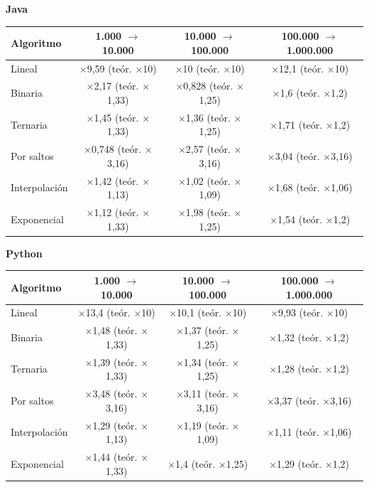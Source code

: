 \textbf{Java}\par\smallskip
{\footnotesize
\begin{tabular}{lccc}
\toprule
Algoritmo & 1.000 $\to$ 10.000 & 10.000 $\to$ 100.000 & 100.000 $\to$ 1.000.000 \\
\midrule
Lineal & $\times$9,59 (te\'or. $\times$10) & $\times$10 (te\'or. $\times$10) & $\times$12,1 (te\'or. $\times$10) \\
Binaria & $\times$2,17 (te\'or. $\times$1,33) & $\times$0,828 (te\'or. $\times$1,25) & $\times$1,6 (te\'or. $\times$1,2) \\
Ternaria & $\times$1,45 (te\'or. $\times$1,33) & $\times$1,36 (te\'or. $\times$1,25) & $\times$1,71 (te\'or. $\times$1,2) \\
Por saltos & $\times$0,748 (te\'or. $\times$3,16) & $\times$2,57 (te\'or. $\times$3,16) & $\times$3,04 (te\'or. $\times$3,16) \\
Interpolaci\'on & $\times$1,42 (te\'or. $\times$1,13) & $\times$1,02 (te\'or. $\times$1,09) & $\times$1,68 (te\'or. $\times$1,06) \\
Exponencial & $\times$1,12 (te\'or. $\times$1,33) & $\times$1,98 (te\'or. $\times$1,25) & $\times$1,54 (te\'or. $\times$1,2) \\
\bottomrule
\end{tabular}}\par
\medskip
\textbf{Python}\par\smallskip
{\footnotesize
\begin{tabular}{lccc}
\toprule
Algoritmo & 1.000 $\to$ 10.000 & 10.000 $\to$ 100.000 & 100.000 $\to$ 1.000.000 \\
\midrule
Lineal & $\times$13,4 (te\'or. $\times$10) & $\times$10,1 (te\'or. $\times$10) & $\times$9,93 (te\'or. $\times$10) \\
Binaria & $\times$1,48 (te\'or. $\times$1,33) & $\times$1,37 (te\'or. $\times$1,25) & $\times$1,32 (te\'or. $\times$1,2) \\
Ternaria & $\times$1,39 (te\'or. $\times$1,33) & $\times$1,34 (te\'or. $\times$1,25) & $\times$1,28 (te\'or. $\times$1,2) \\
Por saltos & $\times$3,48 (te\'or. $\times$3,16) & $\times$3,11 (te\'or. $\times$3,16) & $\times$3,37 (te\'or. $\times$3,16) \\
Interpolaci\'on & $\times$1,29 (te\'or. $\times$1,13) & $\times$1,19 (te\'or. $\times$1,09) & $\times$1,11 (te\'or. $\times$1,06) \\
Exponencial & $\times$1,44 (te\'or. $\times$1,33) & $\times$1,4 (te\'or. $\times$1,25) & $\times$1,29 (te\'or. $\times$1,2) \\
\bottomrule
\end{tabular}}\par
\medskip
